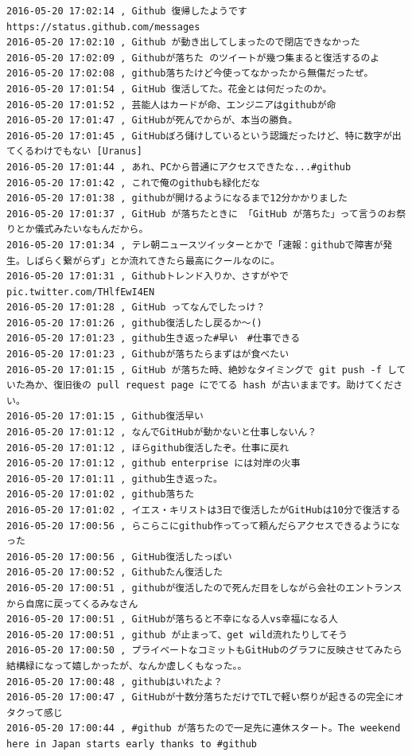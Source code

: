 \begin{verbatim}
2016-05-20 17:02:14 , Github 復帰したようですhttps://status.github.com/messages 
2016-05-20 17:02:10 , Github が動き出してしまったので閉店できなかった
2016-05-20 17:02:09 , Githubが落ちた のツイートが幾つ集まると復活するのよ
2016-05-20 17:02:08 , github落ちたけど今使ってなかったから無傷だったぜ。
2016-05-20 17:01:54 , GitHub 復活してた。花金とは何だったのか。
2016-05-20 17:01:52 , 芸能人はカードが命、エンジニアはgithubが命
2016-05-20 17:01:47 , GitHubが死んでからが、本当の勝負。
2016-05-20 17:01:45 , GitHubぼろ儲けしているという認識だったけど、特に数字が出てくるわけでもない [Uranus]
2016-05-20 17:01:44 , あれ、PCから普通にアクセスできたな...#github
2016-05-20 17:01:42 , これで俺のgithubも緑化だな
2016-05-20 17:01:38 , githubが開けるようになるまで12分かかりました
2016-05-20 17:01:37 , GitHub が落ちたときに 「GitHub が落ちた」って言うのお祭りとか儀式みたいなもんだから。
2016-05-20 17:01:34 , テレ朝ニュースツイッターとかで「速報：githubで障害が発生。しばらく繋がらず」とか流れてきたら最高にクールなのに。
2016-05-20 17:01:31 , Githubトレンド入りか、さすがやで pic.twitter.com/THlfEwI4EN
2016-05-20 17:01:28 , GitHub ってなんでしたっけ？
2016-05-20 17:01:26 , github復活したし戻るか〜()
2016-05-20 17:01:23 , github生き返った#早い　#仕事できる
2016-05-20 17:01:23 , Githubが落ちたらまずはが食べたい
2016-05-20 17:01:15 , GitHub が落ちた時、絶妙なタイミングで git push -f していた為か、復旧後の pull request page にでてる hash が古いままです。助けてください。
2016-05-20 17:01:15 , Github復活早い
2016-05-20 17:01:12 , なんでGitHubが動かないと仕事しないん？
2016-05-20 17:01:12 , ほらgithub復活したぞ。仕事に戻れ
2016-05-20 17:01:12 , github enterprise には対岸の火事
2016-05-20 17:01:11 , github生き返った。
2016-05-20 17:01:02 , github落ちた
2016-05-20 17:01:02 , イエス・キリストは3日で復活したがGitHubは10分で復活する
2016-05-20 17:00:56 , らこらこにgithub作ってって頼んだらアクセスできるようになった
2016-05-20 17:00:56 , GitHub復活したっぽい
2016-05-20 17:00:52 , Githubたん復活した
2016-05-20 17:00:51 , githubが復活したので死んだ目をしながら会社のエントランスから自席に戻ってくるみなさん
2016-05-20 17:00:51 , GitHubが落ちると不幸になる人vs幸福になる人
2016-05-20 17:00:51 , github が止まって、get wild流れたりしてそう
2016-05-20 17:00:50 , プライベートなコミットもGitHubのグラフに反映させてみたら結構緑になって嬉しかったが、なんか虚しくもなった。。
2016-05-20 17:00:48 , githubはいれたよ？
2016-05-20 17:00:47 , GitHubが十数分落ちただけでTLで軽い祭りが起きるの完全にオタクって感じ
2016-05-20 17:00:44 , #github が落ちたので一足先に連休スタート。The weekend 
here in Japan starts early thanks to #github

\end{verbatim}
